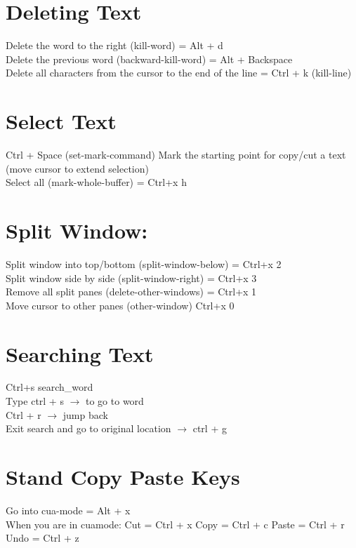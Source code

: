 \documentclass{article}
\begin{document}
\section{Deleting Text}
Delete the word to the right (kill-word) = Alt + d
\\
Delete the previous word (backward-kill-word) = Alt + Backspace
\\
Delete all characters from the cursor to the end of the line = Ctrl + k (kill-line)
\\
\section{Select Text}
Ctrl + Space (set-mark-command) Mark the starting point for copy/cut a text (move cursor to extend selection)
\\
Select all (mark-whole-buffer) = Ctrl+x h
\\
\section{Split Window:}
Split window into top/bottom (split-window-below) = Ctrl+x 2
\\
Split window side by side (split-window-right) = Ctrl+x 3
\\
Remove all split panes (delete-other-windows) = Ctrl+x 1
\\
Move cursor to other panes (other-window) Ctrl+x 0
\\
\section{Searching Text}
Ctrl+s \<search\_word\>
\\
Type ctrl + s $\rightarrow$ to go to word
\\
Ctrl + r $\rightarrow$ jump back
\\
Exit search and go to original location $\rightarrow$ ctrl + g
\\
\section{Stand Copy Paste Keys}
Go into cua-mode = Alt + x
\\
When you are in cuamode:
Cut = Ctrl + x
Copy = Ctrl + c
Paste = Ctrl + r
Undo = Ctrl + z
\\
\end{document}

